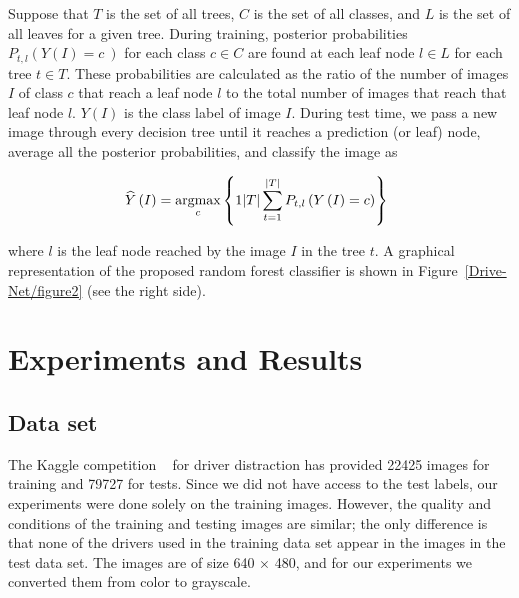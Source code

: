 \documentclass[conference,compsoc]{IEEEtran}
\begin{document}
Suppose that $T $ is the set of all trees, $C $ is the set of all classes, and $L $ is the set of all leaves for a given tree. During training, posterior probabilities $P_{t,l}\left(Y\left(I\right)=c\:\right) $ for each class $c\in C $ are found at each leaf node $l\in L $ for each tree $t\in T $. These probabilities are calculated as the ratio of the number of images $I $ of class $c $ that reach a leaf node $l $ to the total number of images that reach that leaf node $l $. $Y\left(I\right) $ is the class label of image $I $. During test time, we pass a new image through every decision tree until it reaches a prediction (or leaf) node, average all the posterior probabilities, and classify the image as

\let\saveeqnno\theequation
\let\savefrac\frac
\def\dispfrac{\displaystyle\savefrac}
\begin{eqnarray}
\let\frac\dispfrac
\gdef\theequation{3}
\let\theHequation\theequation
\label{disp-formula-group-032e1395024b44bca0feeb46474c0adc}
\begin{array}{@{}l}\widehat Y\left(I\right)=\underset c{\text{argmax}}\left\{\frac1{\left\vert T\right\vert}\sum_{t=1}^{\left\vert T\right\vert}P_{t,l}\left(Y\left(I\right)=c\right)\right\}\end{array}
\end{eqnarray}
\global\let\theequation\saveeqnno
\addtocounter{equation}{-1}\ignorespaces 

where $l $ is the leaf node reached by the image $I $ in the tree $t $. A graphical representation of the proposed random forest classifier is shown in Figure~\ref{Drive-Net/figure2}  (see the right side).
    
\section{Experiments and Results}


\subsection{Data set} The Kaggle competition \unskip~\cite{1641075:26775858} for driver distraction has provided 22425 images for training and 79727 for tests. Since we did not have access to the test labels, our experiments were done solely on the training images. However, the quality and conditions of the training and testing images are similar; the only difference is that none of the drivers used in the training data set appear in the images in the test data set. The images are of size 640 \ensuremath{\times} 480, and for our experiments we converted them from color to grayscale.
\end{document}
